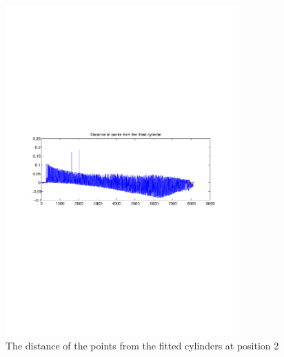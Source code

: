 \begin{figure}[htbp]
    \centering
    \includegraphics[width=0.8\textwidth]{pics/pos21-control-tof-dist}
    \caption{The distance of the points from the fitted cylinders at position 2}
    \label{chap7:fig-pos21-control-tof-dits}
\end{figure}

